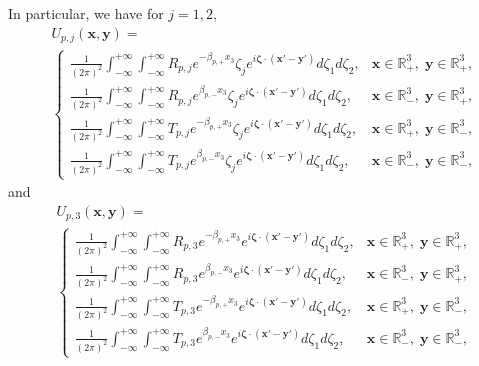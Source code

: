 \documentclass[final,reqno]{siamltex}
\newcommand{\mat}{\mathbb}
\newcommand{\R}{{\mat R}}
\begin{document}
In particular, we have for $j=1,2$, 
\begin{align*}
&U_{p,j}(\mathbf{x},\mathbf{y})=\\
&\left\{
\begin{array}{ll}
	\displaystyle\frac{1}{(2\pi)^2}\int_{-\infty}^{+\infty}\int_{-\infty}^{+\infty}R_{p,j}e^{-\beta_{p,+}x_3}\zeta_je^{i\boldsymbol{\zeta}\cdot(\mathbf{x}'-\mathbf{y}')}d\zeta_1d\zeta_2,&\mathbf{x}\in\R^3_+,\;\mathbf{y}\in\R^3_+,\\
	\displaystyle\frac{1}{(2\pi)^2}\int_{-\infty}^{+\infty}\int_{-\infty}^{+\infty}R_{p,j}e^{\beta_{p,-}x_3}\zeta_je^{i\boldsymbol{\zeta}\cdot(\mathbf{x}'-\mathbf{y}')}d\zeta_1d\zeta_2,&\mathbf{x}\in\R^3_-,\;\mathbf{y}\in\R^3_+, \\
	\displaystyle\frac{1}{(2\pi)^2}\int_{-\infty}^{+\infty}\int_{-\infty}^{+\infty}T_{p,j}e^{-\beta_{p,+}x_3}\zeta_je^{i\boldsymbol{\zeta}\cdot(\mathbf{x}'-\mathbf{y}')}d\zeta_1d\zeta_2,&\mathbf{x}\in\R^3_+,\;\mathbf{y}\in\R^3_-, \\
	\displaystyle\frac{1}{(2\pi)^2}\int_{-\infty}^{+\infty}\int_{-\infty}^{+\infty}T_{p,j}e^{\beta_{p,-}x_3}\zeta_je^{i\boldsymbol{\zeta}\cdot(\mathbf{x}'-\mathbf{y}')}d\zeta_1d\zeta_2,&\mathbf{x}\in\R^3_-,\;\mathbf{y}\in\R^3_-, 
\end{array}
\right.
\end{align*}
and 
\begin{align*}
&U_{p,3}(\mathbf{x},\mathbf{y})=\\
&\left\{
\begin{array}{ll}
	\displaystyle\frac{1}{(2\pi)^2}\int_{-\infty}^{+\infty}\int_{-\infty}^{+\infty}R_{p,3}e^{-\beta_{p,+}x_3}e^{i\boldsymbol{\zeta}\cdot(\mathbf{x}'-\mathbf{y}')}d\zeta_1d\zeta_2,&\mathbf{x}\in\R^3_+,\;\mathbf{y}\in\R^3_+,\\
	\displaystyle\frac{1}{(2\pi)^2}\int_{-\infty}^{+\infty}\int_{-\infty}^{+\infty}R_{p,3}e^{\beta_{p,-}x_3}e^{i\boldsymbol{\zeta}\cdot(\mathbf{x}'-\mathbf{y}')}d\zeta_1d\zeta_2,&\mathbf{x}\in\R^3_-,\;\mathbf{y}\in\R^3_+, \\
	\displaystyle\frac{1}{(2\pi)^2}\int_{-\infty}^{+\infty}\int_{-\infty}^{+\infty}T_{p,3}e^{-\beta_{p,+}x_3}e^{i\boldsymbol{\zeta}\cdot(\mathbf{x}'-\mathbf{y}')}d\zeta_1d\zeta_2,&\mathbf{x}\in\R^3_+,\;\mathbf{y}\in\R^3_-, \\
	\displaystyle\frac{1}{(2\pi)^2}\int_{-\infty}^{+\infty}\int_{-\infty}^{+\infty}T_{p,3}e^{\beta_{p,-}x_3}e^{i\boldsymbol{\zeta}\cdot(\mathbf{x}'-\mathbf{y}')}d\zeta_1d\zeta_2,&\mathbf{x}\in\R^3_-,\;\mathbf{y}\in\R^3_-, 
\end{array}
\right.
\end{align*}
\end{document}
